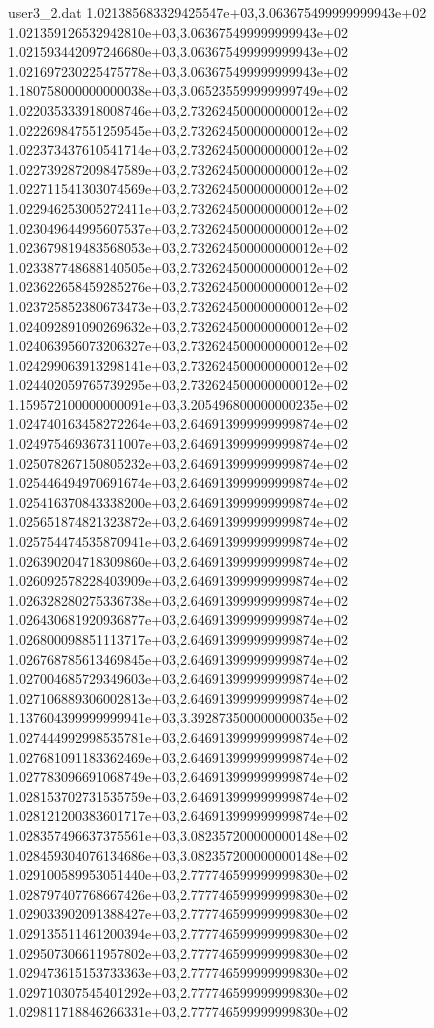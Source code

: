 \begin{filecontents}{user3_2.dat}
1.021385683329425547e+03,3.063675499999999943e+02
1.021359126532942810e+03,3.063675499999999943e+02
1.021593442097246680e+03,3.063675499999999943e+02
1.021697230225475778e+03,3.063675499999999943e+02
1.180758000000000038e+03,3.065235599999999749e+02
1.022035333918008746e+03,2.732624500000000012e+02
1.022269847551259545e+03,2.732624500000000012e+02
1.022373437610541714e+03,2.732624500000000012e+02
1.022739287209847589e+03,2.732624500000000012e+02
1.022711541303074569e+03,2.732624500000000012e+02
1.022946253005272411e+03,2.732624500000000012e+02
1.023049644995607537e+03,2.732624500000000012e+02
1.023679819483568053e+03,2.732624500000000012e+02
1.023387748688140505e+03,2.732624500000000012e+02
1.023622658459285276e+03,2.732624500000000012e+02
1.023725852380673473e+03,2.732624500000000012e+02
1.024092891090269632e+03,2.732624500000000012e+02
1.024063956073206327e+03,2.732624500000000012e+02
1.024299063913298141e+03,2.732624500000000012e+02
1.024402059765739295e+03,2.732624500000000012e+02
1.159572100000000091e+03,3.205496800000000235e+02
1.024740163458272264e+03,2.646913999999999874e+02
1.024975469367311007e+03,2.646913999999999874e+02
1.025078267150805232e+03,2.646913999999999874e+02
1.025446494970691674e+03,2.646913999999999874e+02
1.025416370843338200e+03,2.646913999999999874e+02
1.025651874821323872e+03,2.646913999999999874e+02
1.025754474535870941e+03,2.646913999999999874e+02
1.026390204718309860e+03,2.646913999999999874e+02
1.026092578228403909e+03,2.646913999999999874e+02
1.026328280275336738e+03,2.646913999999999874e+02
1.026430681920936877e+03,2.646913999999999874e+02
1.026800098851113717e+03,2.646913999999999874e+02
1.026768785613469845e+03,2.646913999999999874e+02
1.027004685729349603e+03,2.646913999999999874e+02
1.027106889306002813e+03,2.646913999999999874e+02
1.137604399999999941e+03,3.392873500000000035e+02
1.027444992998535781e+03,2.646913999999999874e+02
1.027681091183362469e+03,2.646913999999999874e+02
1.027783096691068749e+03,2.646913999999999874e+02
1.028153702731535759e+03,2.646913999999999874e+02
1.028121200383601717e+03,2.646913999999999874e+02
1.028357496637375561e+03,3.082357200000000148e+02
1.028459304076134686e+03,3.082357200000000148e+02
1.029100589953051440e+03,2.777746599999999830e+02
1.028797407768667426e+03,2.777746599999999830e+02
1.029033902091388427e+03,2.777746599999999830e+02
1.029135511461200394e+03,2.777746599999999830e+02
1.029507306611957802e+03,2.777746599999999830e+02
1.029473615153733363e+03,2.777746599999999830e+02
1.029710307545401292e+03,2.777746599999999830e+02
1.029811718846266331e+03,2.777746599999999830e+02

\end{filecontents}
